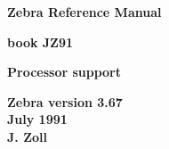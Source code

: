 \thispagestyle{empty}     %
\vspace*{-20mm}
\begin{center} {\large\bf Zebra Reference Manual} \vspace{8mm} \end{center}
\begin{center} {\LARGE\bf book JZ91} \vspace{2mm} \end{center}
\begin{center} {\Large\bf Processor support} \vspace{4mm} \end{center}
\begin{center}
  {\large\bf Zebra version 3.67 \vspace{2mm} \\
             July 1991          \vspace{2mm} \\
             J. Zoll}
\end{center}
\vspace*{20pt}
